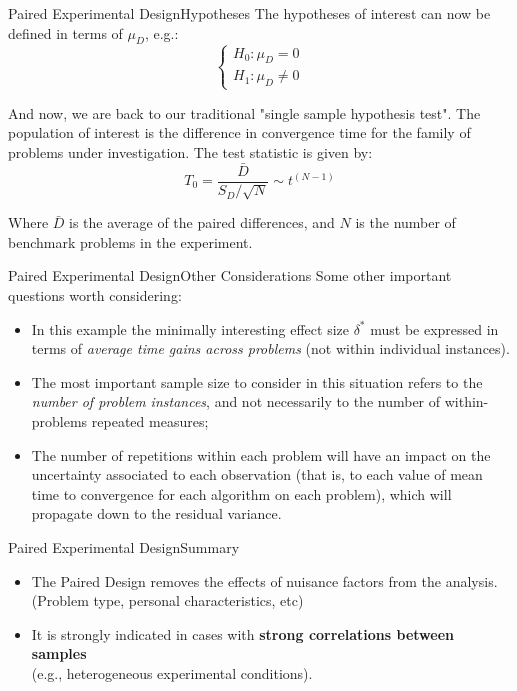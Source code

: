 \begin{frame}{Paired Experimental Design}{Hypotheses}
The hypotheses of interest can now be defined in terms of $\mu_D$, e.g.:
\begin{equation*}\begin{cases}
H_0: \mu_D = 0\\
H_1: \mu_D \neq 0
\end{cases}\end{equation*}

And now, we are back to our traditional "single sample hypothesis test". The population of interest is the difference in convergence time for the family of problems under investigation. The test statistic is given by:
\begin{equation*}
  T_0 = \frac{\bar{D}}{S_D/\sqrt{N}}\sim t^{(N-1)}
\end{equation*}
\bigskip

Where $\bar{D}$ is the average of the paired differences, and $N$ is the number of benchmark problems in the experiment.
\end{frame}


\begin{frame}{Paired Experimental Design}{Other Considerations}
Some other important questions worth considering:
\medskip

\begin{itemize}
\item In this example the minimally interesting effect size $\delta^*$ must be expressed in terms of \textit{average time gains across problems} (not within individual instances).
\item The most important sample size to consider in this situation refers to the \textit{number of problem instances}, and not necessarily to the number of within-problems repeated measures;
\item The number of repetitions within each problem will have an impact on the uncertainty associated to each observation (that is, to each value of mean time to convergence for each algorithm on each problem), which will propagate down to the residual variance.
\end{itemize}
\end{frame}



\begin{frame}{Paired Experimental Design}{Summary}

\begin{itemize}
  \item The Paired Design removes the effects of  nuisance factors from the analysis. (Problem type, personal characteristics, etc)\bigskip

  \item It is strongly indicated in cases with {\bf strong correlations between samples}\\
  (e.g., heterogeneous experimental conditions).
\end{itemize}
\end{frame}

